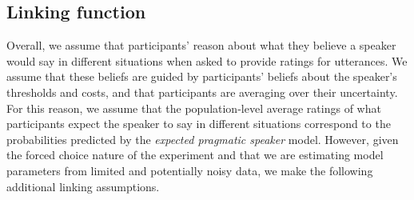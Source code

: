 \documentclass[lucida,biblatex]{sp} %
\begin{document}



\subsection{Linking function}

Overall, we assume that participants' reason about what they believe a speaker would say 
in different situations when asked to provide ratings for utterances. 
We assume that these beliefs are guided by participants' beliefs about the speaker's thresholds and costs, and 
that participants are averaging over their uncertainty. For this reason, we assume that the population-level 
average ratings of what participants expect the speaker to say in different situations 
correspond to the probabilities predicted by the \textit{expected pragmatic speaker} model.
However, given the forced choice nature of the experiment and that we are estimating model 
parameters from limited and potentially noisy data, we make the following additional linking assumptions.
\end{document}
